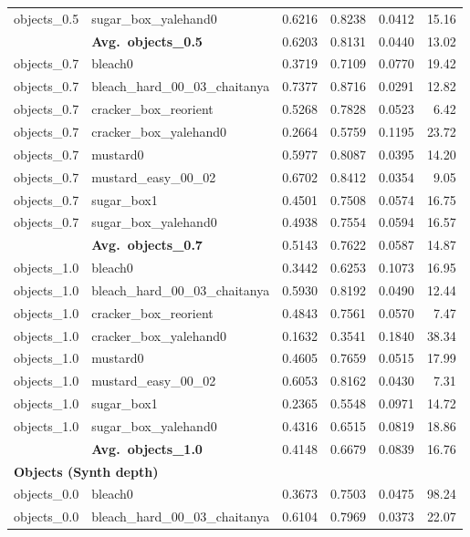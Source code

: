 \begin{longtable}{llrrrr}
  objects_0.5 & sugar\_box\_yalehand0 & 0.6216 & 0.8238 & 0.0412 & 15.16 \\
  \cmidrule{2-6}
  & \textbf{Avg.~objects_0.5} & 0.6203 & 0.8131 & 0.0440 & 13.02 \\
  \midrule
  objects_0.7 & bleach0 & 0.3719 & 0.7109 & 0.0770 & 19.42 \\
  objects_0.7 & bleach\_hard\_00\_03\_chaitanya & 0.7377 & 0.8716 & 0.0291 & 12.82 \\
  objects_0.7 & cracker\_box\_reorient & 0.5268 & 0.7828 & 0.0523 & 6.42 \\
  objects_0.7 & cracker\_box\_yalehand0 & 0.2664 & 0.5759 & 0.1195 & 23.72 \\
  objects_0.7 & mustard0 & 0.5977 & 0.8087 & 0.0395 & 14.20 \\
  objects_0.7 & mustard\_easy\_00\_02 & 0.6702 & 0.8412 & 0.0354 & 9.05 \\
  objects_0.7 & sugar\_box1 & 0.4501 & 0.7508 & 0.0574 & 16.75 \\
  objects_0.7 & sugar\_box\_yalehand0 & 0.4938 & 0.7554 & 0.0594 & 16.57 \\
  \cmidrule{2-6}
  & \textbf{Avg.~objects_0.7} & 0.5143 & 0.7622 & 0.0587 & 14.87 \\
  \midrule
  objects_1.0 & bleach0 & 0.3442 & 0.6253 & 0.1073 & 16.95 \\
  objects_1.0 & bleach\_hard\_00\_03\_chaitanya & 0.5930 & 0.8192 & 0.0490 & 12.44 \\
  objects_1.0 & cracker\_box\_reorient & 0.4843 & 0.7561 & 0.0570 & 7.47 \\
  objects_1.0 & cracker\_box\_yalehand0 & 0.1632 & 0.3541 & 0.1840 & 38.34 \\
  objects_1.0 & mustard0 & 0.4605 & 0.7659 & 0.0515 & 17.99 \\
  objects_1.0 & mustard\_easy\_00\_02 & 0.6053 & 0.8162 & 0.0430 & 7.31 \\
  objects_1.0 & sugar\_box1 & 0.2365 & 0.5548 & 0.0971 & 14.72 \\
  objects_1.0 & sugar\_box\_yalehand0 & 0.4316 & 0.6515 & 0.0819 & 18.86 \\
  \cmidrule{2-6}
  & \textbf{Avg.~objects_1.0} & 0.4148 & 0.6679 & 0.0839 & 16.76 \\
  \midrule
\multicolumn{6}{l}{\textbf{Objects (Synth depth)}} \\
\midrule
  objects_0.0 & bleach0 & 0.3673 & 0.7503 & 0.0475 & 98.24 \\
  objects_0.0 & bleach\_hard\_00\_03\_chaitanya & 0.6104 & 0.7969 & 0.0373 & 22.07 \\

\end{longtable}
